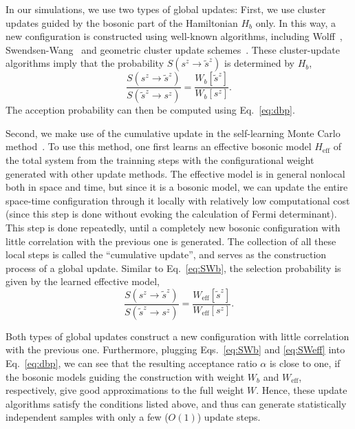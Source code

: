 \documentclass[aps,prx,twocolumn,superscriptaddress,showpacs,floatfix]{revtex4-1}
\begin{document}
In our simulations, we use two types of global updates:
First, we use cluster updates guided by the bosonic part of the Hamiltonian $H_b$ only.
In this way, a new configuration is constructed using well-known algorithms, including Wolff~\cite{Wolff1989}, Swendsen-Wang~\cite{Swendsen1987} and geometric cluster update schemes~\cite{Heringa1998}.
These cluster-update algorithms imply that the probability $S\left(s^z\rightarrow\tilde s^z\right)$ is determined by $H_b$,
\begin{equation}
\label{eq:SWb}
\frac{S\left(s^z\rightarrow\tilde s^z\right)}
{S\left(\tilde s^z\rightarrow s^z\right)}
=\frac{W_b[\tilde s^z]}{W_b[s^z]}.
\end{equation}
The acception probability can then be computed using Eq.~\eqref{eq:dbp}.

Second, we make use of the cumulative update in the self-learning Monte Carlo method~\cite{liu2016self,liu2016fermion,Xu2016self}. To use this method, one first learns an effective bosonic model $H_{\text{eff}}$ of the total system from the trainning steps with the configurational weight generated with other update methods. The effective model is in general nonlocal both in space and time, but since it is a bosonic model, we can update the entire space-time configuration through it locally with relatively low computational cost (since this step is done without evoking the calculation of Fermi determinant).
This step is done repeatedly, until a completely new bosonic configuration with little correlation with the previous one is generated.
The collection of all these local steps is called the ``cumulative update'', and serves as the construction process of a global update.
Similar to Eq.~\eqref{eq:SWb}, the selection probability is given by the learned effective model,
\begin{equation}
\label{eq:SWeff}
\frac{S\left(s^z\rightarrow\tilde s^z\right)}
{S\left(\tilde s^z\rightarrow s^z\right)}
=\frac{W_{\text{eff}}[\tilde s^z]}{W_{\text{eff}}[s^z]}.
\end{equation}

Both types of global updates construct a new configuration with little correlation with the previous one. Furthermore, plugging Eqs.~\eqref{eq:SWb} and \eqref{eq:SWeff} into Eq.~\eqref{eq:dbp}, we can see that the resulting acceptance ratio $\alpha$ is close to one, if the bosonic models guiding the construction with weight $W_b$ and $W_{\text{eff}}$, respectively, give good approximations to the full weight $W$.
Hence, these update algorithms satisfy the conditions listed above, and thus can generate statistically independent samples with only a few ($O(1)$) update steps.
\end{document}
